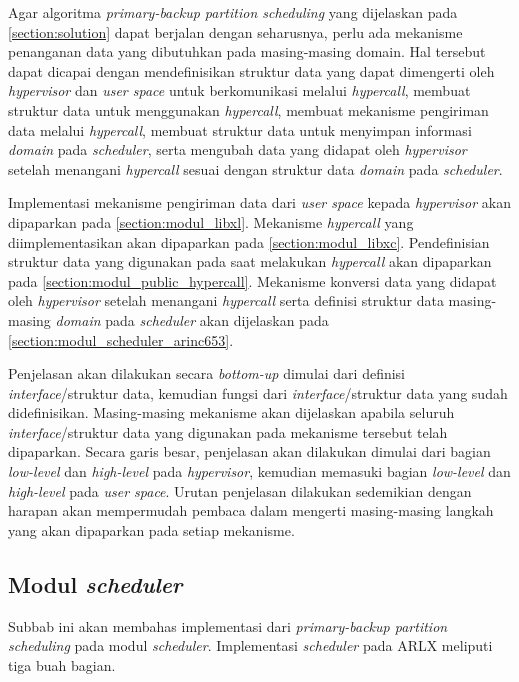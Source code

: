 Agar algoritma \textit{primary-backup partition scheduling} yang dijelaskan pada
\autoref{section:solution} dapat berjalan dengan seharusnya, perlu ada mekanisme penanganan data
yang dibutuhkan pada masing-masing domain. Hal tersebut dapat dicapai dengan mendefinisikan
struktur data yang dapat dimengerti oleh \textit{hypervisor} dan \textit{user space} untuk
berkomunikasi melalui \textit{hypercall}, membuat struktur data untuk menggunakan
\textit{hypercall}, membuat mekanisme pengiriman data melalui \textit{hypercall}, membuat
struktur data untuk menyimpan informasi \textit{domain} pada \textit{scheduler}, serta mengubah
data yang didapat oleh \textit{hypervisor} setelah menangani \textit{hypercall} sesuai dengan
struktur data \textit{domain} pada \textit{scheduler}.

Implementasi mekanisme pengiriman data dari \textit{user space} kepada \textit{hypervisor} akan
dipaparkan pada \autoref{section:modul_libxl}. Mekanisme \textit{hypercall} yang
diimplementasikan akan dipaparkan pada \autoref{section:modul_libxc}. Pendefinisian struktur
data yang digunakan pada saat melakukan \textit{hypercall} akan dipaparkan pada
\autoref{section:modul_public_hypercall}. Mekanisme konversi data yang didapat oleh
\textit{hypervisor} setelah menangani \textit{hypercall} serta definisi struktur data
masing-masing \textit{domain} pada \textit{scheduler} akan dijelaskan pada
\autoref{section:modul_scheduler_arinc653}.

Penjelasan akan dilakukan secara \textit{bottom-up} dimulai dari definisi
\textit{interface}/struktur data, kemudian fungsi dari \textit{interface}/struktur data yang
sudah didefinisikan. Masing-masing mekanisme akan dijelaskan apabila seluruh
\textit{interface}/struktur data yang digunakan pada mekanisme tersebut telah dipaparkan. Secara
garis besar, penjelasan akan dilakukan dimulai dari bagian \textit{low-level} dan
\textit{high-level} pada \textit{hypervisor}, kemudian memasuki bagian \textit{low-level} dan
\textit{high-level} pada \textit{user space}. Urutan penjelasan dilakukan sedemikian dengan
harapan akan mempermudah pembaca dalam mengerti masing-masing langkah yang akan dipaparkan pada
setiap mekanisme.

\subsection{Modul \textit{scheduler}}
\label{section:modul_scheduler_arinc653}

Subbab ini akan membahas implementasi dari \textit{primary-backup partition scheduling} pada
modul \textit{scheduler}. Implementasi \textit{scheduler} pada ARLX meliputi tiga buah
bagian.

